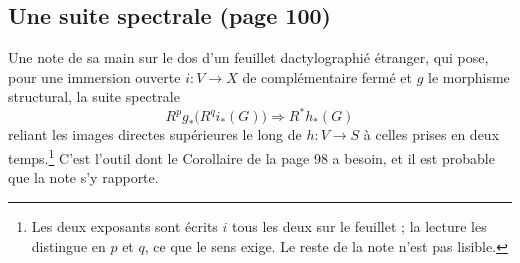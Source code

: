 \documentclass[11pt,a4paper]{article}
\begin{document}
\subsection*{Une suite spectrale (page 100)}

Une note de sa main sur le dos d'un feuillet dactylographié étranger, qui pose,
pour une immersion ouverte $i : V \to X$ de complémentaire fermé et $g$ le
morphisme structural, la suite spectrale
\[
R^p g_{*}\bigl(R^q i_{*}(G)\bigr) \Longrightarrow R^{*} h_{*}(G)
\]
reliant les images directes supérieures le long de $h : V \to S$ à celles prises
en deux temps.\footnote{Les deux exposants sont écrits $i$ tous les deux sur le
feuillet ; la lecture les distingue en $p$ et $q$, ce que le sens exige. Le
reste de la note n'est pas lisible.} C'est l'outil dont le Corollaire de la
page 98 a besoin, et il est probable que la note s'y rapporte.
\end{document}
